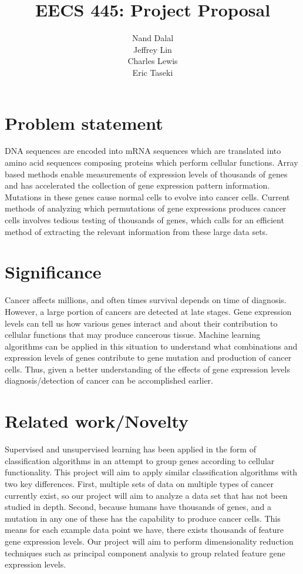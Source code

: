 \documentclass[11pt]{amsart}
\title{EECS 445: Project Proposal}
\author{Nand Dalal
\\Jeffrey Lin
\\Charles Lewis
\\Eric Taseki}
\begin{document}
\maketitle


\tableofcontents{}
\newpage

\section{Problem statement}

DNA sequences are encoded into mRNA sequences which are translated into amino acid sequences composing proteins which perform cellular functions. Array based methods enable measurements of expression levels of thousands of genes and has accelerated the collection of gene expression pattern information. Mutations in these genes cause normal cells to evolve into cancer cells. Current methods of analyzing which permutations of gene expressions produces cancer cells involves tedious testing of thousands of genes, which calls for an efficient method of extracting the relevant information from these large data sets.

\section{Significance}

Cancer affects millions, and often times survival depends on time of diagnosis. However, a large portion of cancers are detected at late stages. Gene expression levels can tell us how various genes interact and about their contribution to cellular functions that may produce cancerous tissue. Machine learning algorithms can be applied in this situation to understand what combinations and expression levels of genes contribute to gene mutation and production of cancer cells. Thus, given a better understanding of the effects of gene expression levels diagnosis/detection of cancer can be accomplished earlier.

\section{Related work/Novelty}

Supervised and unsupervised learning has been applied in the form of classification algorithms in an attempt to group genes according to cellular functionality. This project will aim to apply similar classification algorithms with two key differences. First, multiple sets of data on multiple types of cancer currently exist, so our project will aim to analyze a data set that has not been studied in depth. Second, because humans have thousands of genes, and a mutation in any one of these has the capability to produce cancer cells. This means for each example data point we have, there exists thousands of feature gene expression levels. Our project will aim to perform dimensionality reduction techniques such as principal component analysis to group related feature gene expression levels.
\end{document}

